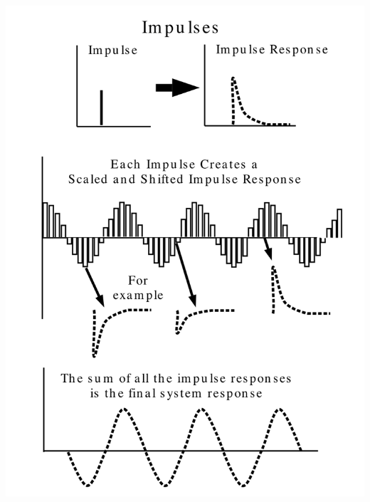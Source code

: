 \documentclass[11pt]{book}
\begin{document}
\begin{center}\includegraphics[width=\textwidth]{figures/13.03.png}\end{center}
\end{document}
